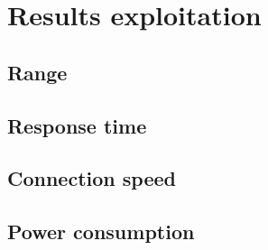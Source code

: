 \section{Results exploitation} \label{sec:Results exploitation}





\subsection{Range}

\subsection{Response time}

\subsection{Connection speed}

\subsection{Power consumption}
